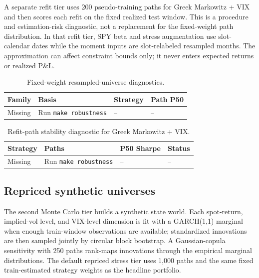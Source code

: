 A separate refit tier uses 200 pseudo-training paths for Greek Markowitz + VIX and then
scores each refit on the fixed realized test window. This is a procedure and
estimation-risk diagnostic, not a replacement for the fixed-weight path distribution. In
that refit tier, SPY beta and stress augmentation use slot-calendar dates while the moment
inputs are slot-relabeled resampled months. The approximation can affect constraint bounds
only; it never enters expected returns or realized P\&L.

\begin{table}[H]
\centering
\scriptsize
{}
  {\resizebox{\textwidth}{!}{}}
  {\begin{tabular}{llll}\toprule Family & Basis & Strategy & Path P50 \\\midrule Missing & Run \texttt{make robustness} & -- & -- \\\bottomrule\end{tabular}}
\caption{Fixed-weight resampled-universe diagnostics.}
\label{tab:mc_resampled_universes}
\end{table}

\begin{table}[H]
\centering
\scriptsize
{}
  {\resizebox{\textwidth}{!}{}}
  {\begin{tabular}{llll}\toprule Strategy & Paths & P50 Sharpe & Status \\\midrule Missing & Run \texttt{make robustness} & -- & -- \\\bottomrule\end{tabular}}
\caption{Refit-path stability diagnostic for Greek Markowitz + VIX.}
\label{tab:mc_refit_stability}
\end{table}

\clearpage

\subsection{Repriced synthetic universes}

The second Monte Carlo tier builds a synthetic state world. Each spot-return, implied-vol
level, and VIX-level dimension is fit with a GARCH(1,1) marginal when enough train-window
observations are available; standardized innovations are then sampled jointly by circular
block bootstrap. A Gaussian-copula sensitivity with 250 paths rank-maps innovations
through the empirical marginal distributions. The default repriced stress tier uses 1,000
paths and the same fixed train-estimated strategy weights as the headline portfolio.

